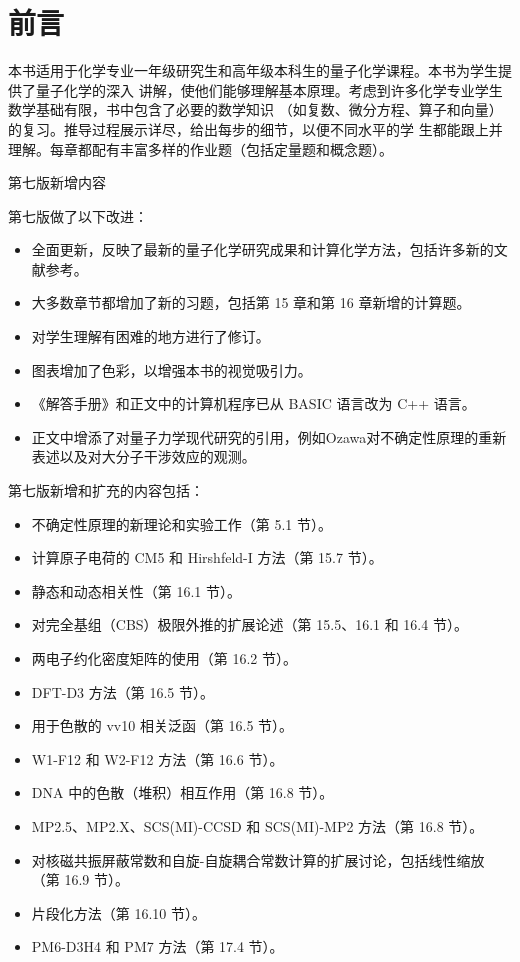 \documentclass[12pt,a4paper,openany]{ctexbook}
\begin{document}
\chapter*{前言}   %
\begin{flushleft} %
本书适用于化学专业一年级研究生和高年级本科生的量子化学课程。本书为学生提供了量子化学的深入%
讲解，使他们能够理解基本原理。考虑到许多化学专业学生数学基础有限，书中包含了必要的数学知识%
（如复数、微分方程、算子和向量）的复习。推导过程展示详尽，给出每步的细节，以便不同水平的学%
生都能跟上并理解。每章都配有丰富多样的作业题（包括定量题和概念题）。

\vspace{\baselineskip}
第七版新增内容
\vspace{\baselineskip}

第七版做了以下改进：
\begin{itemize}
  \item 全面更新，反映了最新的量子化学研究成果和计算化学方法，包括许多新的文献参考。
  \item 大多数章节都增加了新的习题，包括第 15 章和第 16 章新增的计算题。
  \item 对学生理解有困难的地方进行了修订。
  \item 图表增加了色彩，以增强本书的视觉吸引力。
  \item 《解答手册》和正文中的计算机程序已从 BASIC 语言改为 C++ 语言。
  \item 正文中增添了对量子力学现代研究的引用，例如Ozawa对不确定性原理的重新表述以及对大分子干涉效应的观测。
\end{itemize}

\medskip %

第七版新增和扩充的内容包括：
\begin{itemize}
  \item 不确定性原理的新理论和实验工作（第 5.1 节）。
  \item 计算原子电荷的 CM5 和 Hirshfeld-I 方法（第 15.7 节）。
  \item 静态和动态相关性（第 16.1 节）。
  \item 对完全基组（CBS）极限外推的扩展论述（第 15.5、16.1 和 16.4 节）。
  \item 两电子约化密度矩阵的使用（第 16.2 节）。
  \item DFT-D3 方法（第 16.5 节）。
  \item 用于色散的 vv10 相关泛函（第 16.5 节）。
  \item W1-F12 和 W2-F12 方法（第 16.6 节）。
  \item DNA 中的色散（堆积）相互作用（第 16.8 节）。
  \item MP2.5、MP2.X、SCS(MI)-CCSD 和 SCS(MI)-MP2 方法（第 16.8 节）。
  \item 对核磁共振屏蔽常数和自旋-自旋耦合常数计算的扩展讨论，包括线性缩放（第 16.9 节）。
  \item 片段化方法（第 16.10 节）。
  \item PM6-D3H4 和 PM7 方法（第 17.4 节）。
\end{itemize}


\end{flushleft}
\end{document}
